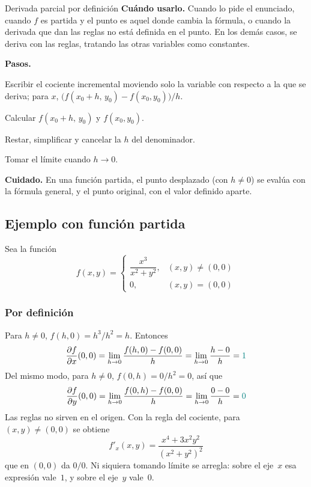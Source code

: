 \documentclass{article}
\newcommand{\rotulo}[2][principal]{\textsf{\bfseries\color{#1}#2}\enspace}
\begin{document}
\begin{metodo}[label=met:parcial-definicion]{Derivada parcial por definición}
\rotulo{Cuándo usarlo.} Cuando lo pide el enunciado, cuando \(f\) es partida y el punto es aquel donde cambia la fórmula, o cuando la derivada que dan las reglas no está definida en el punto. En los demás casos, se deriva con las reglas, tratando las otras variables como constantes.

\rotulo{Pasos.}
\begin{pasos}
  \item Escribir el cociente incremental moviendo solo la variable con respecto a la que se deriva; para \(x\), \(\bigl(f(x_0+h,\,y_0)-f(x_0,y_0)\bigr)/h\).
  \item Calcular \(f(x_0+h,\,y_0)\) y \(f(x_0,y_0)\).
  \item Restar, simplificar y cancelar la \(h\) del denominador.
  \item Tomar el límite cuando \(h\to0\).
\end{pasos}
\rotulo{Cuidado.} En una función partida, el punto desplazado (con \(h\neq0\)) se evalúa con la fórmula general, y el punto original, con el valor definido aparte.
\end{metodo}



\subsection*{Ejemplo con función partida}

Sea la función
\[
f(x,y)=
\begin{cases}
\dfrac{x^{3}}{x^{2}+y^{2}}, & (x,y)\neq(0,0)\\[6pt]
0, & (x,y)=(0,0)
\end{cases}
\]

\subsubsection*{Por definición}

Para \(h\neq0\), \(f(h,0)=h^{3}/h^{2}=h\). Entonces
\[
\frac{\partial f}{\partial x}(0,0)
=\lim_{h\to0}\frac{f(h,0)-f(0,0)}{h}
=\lim_{h\to0}\frac{h-0}{h}
=\color{teal}1
\]
Del mismo modo, para \(h\neq0\), \(f(0,h)=0/h^{2}=0\), así que
\[
\frac{\partial f}{\partial y}(0,0)
=\lim_{h\to0}\frac{f(0,h)-f(0,0)}{h}
=\lim_{h\to0}\frac{0-0}{h}
=\color{teal}0
\]
Las reglas no sirven en el origen. Con la regla del cociente, para \((x,y)\neq(0,0)\) se obtiene
\[
f'_x(x,y)=\frac{x^{4}+3x^{2}y^{2}}{(x^{2}+y^{2})^{2}}
\]
que en \((0,0)\) da \(0/0\). Ni siquiera tomando límite se arregla: sobre el eje~\(x\) esa expresión vale~\(1\), y sobre el eje~\(y\) vale~\(0\).
\end{document}
